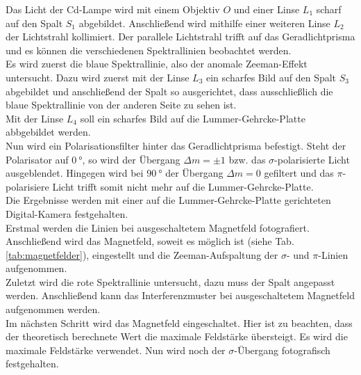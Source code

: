 Das Licht der Cd-Lampe wird mit einem Objektiv $O$ und einer Linse $L_1$ scharf auf den Spalt $S_1$ abgebildet.
Anschließend wird mithilfe einer weiteren Linse $L_2$ der Lichtstrahl kollimiert.
Der parallele Lichtstrahl trifft auf das Geradlichtprisma und es können die verschiedenen Spektrallinien beobachtet werden.
\\
Es wird zuerst die blaue Spektrallinie, also der anomale Zeeman-Effekt untersucht.
Dazu wird zuerst mit der Linse $L_3$ ein scharfes Bild auf den Spalt $S_3$ abgebildet und anschließend der Spalt so ausgerichtet, dass ausschließlich die blaue Spektrallinie von der anderen Seite zu sehen ist.
\\
Mit der Linse $L_4$ soll ein scharfes Bild auf die Lummer-Gehrcke-Platte abbgebildet werden.
\\
Nun wird ein Polarisationsfilter hinter das Geradlichtprisma befestigt.
Steht der Polarisator auf $\SI{0}{\degree}$, so wird der Übergang $\Delta m = \pm 1$ bzw. das $\sigma$-polarisierte Licht ausgeblendet.
Hingegen wird bei $\SI{90}{\degree}$ der Übergang $\Delta m = 0$ gefiltert und das $\pi$-polarisiere Licht trifft somit nicht mehr auf die Lummer-Gehrcke-Platte.
\\
Die Ergebnisse werden mit einer auf die Lummer-Gehrcke-Platte gerichteten Digital-Kamera festgehalten.
\\
Erstmal werden die Linien bei ausgeschaltetem Magnetfeld fotografiert.
Anschließend wird das Magnetfeld, soweit es möglich ist (siehe Tab. \ref{tab:magnetfelder}), eingestellt und die Zeeman-Aufspaltung der $\sigma$- und $\pi$-Linien aufgenommen.
\\
Zuletzt wird die rote Spektrallinie untersucht, dazu muss der Spalt angepasst werden.
Anschließend kann das Interferenzmuster bei ausgeschaltetem Magnetfeld aufgenommen werden.
\\
Im nächsten Schritt wird das Magnetfeld eingeschaltet.
Hier ist zu beachten, dass der theoretisch berechnete Wert die maximale Feldstärke übersteigt.
Es wird die maximale Feldstärke verwendet.
Nun wird noch der $\sigma$-Übergang fotografisch festgehalten.